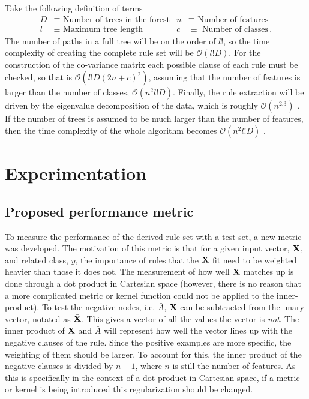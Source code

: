 \documentclass[10pt]{article}
\begin{document}
Take the following definition of terms
\begin{align*}
D & \equiv \text{ Number of trees in the forest} & n & \equiv \text{ Number of features} \\
l &\equiv \text{ Maximum tree length} & c &\equiv \text{ Number of classes} \, .
\end{align*}
The number of paths in a full tree will be on the order of $l!$, so the time complexity of creating the complete rule set will be $\mathcal{O}(l! D)$. For the construction of the co-variance matrix each possible clause of each rule must be checked, so that is $\mathcal{O}(l!D(2n+c)^2)$, assuming that the number of features is larger than the number of classes, $\mathcal{O}(n^2l!D)$. Finally, the rule extraction will be driven by the eigenvalue decomposition of the data, which is roughly $\mathcal{O}(n^{2.3})$ \citep{strang2006linear}. If the number of trees is assumed to be much larger than the number of features, then the time complexity of the whole algorithm becomes $\mathcal{O}(n^2 l! D)$ .
 
 
\section{Experimentation}
\label{sec:experiment}
\subsection{Proposed performance metric}
To measure the performance of the derived rule set with a test set, a new metric was developed. The motivation of this metric is that for a given input vector, $\vb{X}$, and related class, $y$, the importance of rules that the $\vb{X}$ fit need to be weighted heavier than those it does not. The measurement of how well $\vb{X}$ matches up is done through a dot product in Cartesian space (however, there is no reason that a more complicated metric or kernel function could not be applied to the inner-product). To test the negative nodes, i.e. $\bar{A}$, $\vb{X}$ can be subtracted from the unary vector, notated as $\bar{\vb{X}}$. This gives a vector of all the values the vector is \textit{not}. The inner product of $\bar{\vb{X}}$ and $\bar{A}$ will represent how well the vector lines up with the negative clauses of the rule. Since the positive examples are more specific, the weighting of them should be larger. To account for this, the inner product of the negative clauses is divided by $n-1$, where $n$ is still the number of features. As this is specifically in the context of a dot product in Cartesian space, if a metric or kernel is being introduced this regularization should be changed. 
\end{document}
